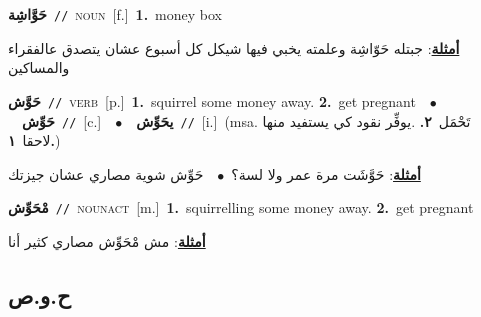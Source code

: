 \documentclass[10pt,a4paper,twoside]{article} %
\begin{document}
\begin{multicols}{2}
{\setlength\topsep{0pt}\textbf{\foreignlanguage{arabic}{حَوَّاشِة}}\ {\color{gray}\texttt{//}\color{black}}\ \textsc{noun}\ [f.]\ \textbf{1.}~money box\  \begin{flushright}\color{gray}\foreignlanguage{arabic}{\textbf{\underline{\foreignlanguage{arabic}{أمثلة}}}: جبتله حَوّاشِة وعلمته يخبي فيها شيكل كل أسبوع عشان يتصدق عالفقراء والمساكين}\end{flushright}\color{black}} \vspace{2mm}

{\setlength\topsep{0pt}\textbf{\foreignlanguage{arabic}{حَوَّش}}\ {\color{gray}\texttt{//}\color{black}}\ \textsc{verb}\ [p.]\ \textbf{1.}~squirrel some money away.  \textbf{2.}~get pregnant\ \ $\bullet$\ \ \setlength\topsep{0pt}\textbf{\foreignlanguage{arabic}{حَوِّش}}\ {\color{gray}\texttt{//}\color{black}}\ [c.]\ \ $\bullet$\ \ \setlength\topsep{0pt}\textbf{\foreignlanguage{arabic}{يحَوِّش}}\ {\color{gray}\texttt{//}\color{black}}\ [i.]\ \color{gray}(msa. \foreignlanguage{arabic}{تَحْمَل}~\foreignlanguage{arabic}{\textbf{٢.}}  .\foreignlanguage{arabic}{يوفِّر نقود كي يستفيد منها لاحقا}~\foreignlanguage{arabic}{\textbf{١.}})\color{black}\  \begin{flushright}\color{gray}\foreignlanguage{arabic}{\textbf{\underline{\foreignlanguage{arabic}{أمثلة}}}: حَوَّشَت مرة عمر ولا لسة؟\ $\bullet$\ \  حَوِّش شوية مصاري عشان جيزتك}\end{flushright}\color{black}} \vspace{2mm}

{\setlength\topsep{0pt}\textbf{\foreignlanguage{arabic}{مْحَوِّش}}\ {\color{gray}\texttt{//}\color{black}}\ \textsc{noun\textunderscore act}\ [m.]\ \textbf{1.}~squirrelling some money away.  \textbf{2.}~get pregnant\  \begin{flushright}\color{gray}\foreignlanguage{arabic}{\textbf{\underline{\foreignlanguage{arabic}{أمثلة}}}: مش مْحَوِّش مصاري كثير أنا}\end{flushright}\color{black}} \vspace{2mm}

\vspace{-3mm}
\subsection*{\color{blue}\foreignlanguage{arabic}{ح.و.ص}\color{blue}{}} 


\end{multicols}
\end{document}
